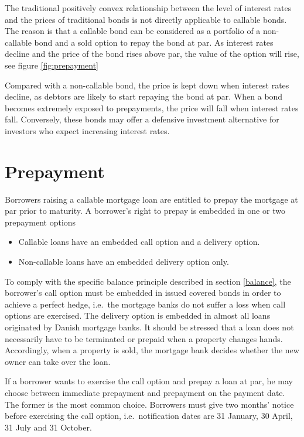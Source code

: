 \documentclass[12pt,twoside]{reedthesis}
\begin{document}
The traditional positively convex relationship between the level of interest rates and the prices of traditional bonds is not directly applicable to callable bonds. The reason is that a callable bond can be considered as a portfolio of a non-callable bond and a sold option to repay the bond at par. As interest rates decline and the price of the bond rises above par, the value of the option will rise, see figure \ref{fig:prepayment}

Compared with a non-callable bond, the price is kept down when interest rates decline, as debtors are likely to start repaying the bond at par. When a bond becomes extremely exposed to prepayments, the price will fall when interest rates fall. Conversely, these bonds may offer a defensive investment alternative for investors who expect increasing interest rates.

\hypertarget{prepayment}{%
\section{Prepayment}\label{prepayment}}

Borrowers raising a callable mortgage loan are entitled to prepay the mortgage at par prior to maturity. A borrower's right to prepay is embedded in one or two prepayment options
\begin{itemize}
\item
  Callable loans have an embedded call option and a delivery option.
\item
  Non-callable loans have an embedded delivery option only.
\end{itemize}
To comply with the specific balance principle described in section \ref{balance}, the borrower's call option must be embedded in issued covered bonds in order to achieve a perfect hedge, i.e.~the mortgage banks do not suffer a loss when call options are exercised. The delivery option is embedded in almost all loans originated by Danish mortgage banks. It should be stressed that a loan does not necessarily have to be terminated or prepaid when a property changes hands. Accordingly, when a property is sold, the mortgage bank decides whether the new
owner can take over the loan.

If a borrower wants to exercise the call option and prepay a loan at par, he may choose between immediate prepayment and prepayment on the payment date. The former is the most common choice. Borrowers must give two months' notice before exercising the call option, i.e.~notification dates are 31 January, 30 April, 31 July and 31 October.
\end{document}
